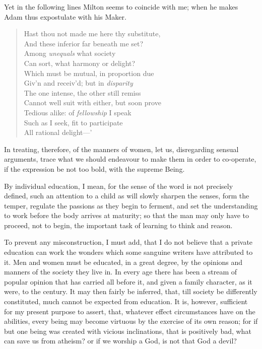 Yet in the following lines Milton seems to coincide with me; when he
makes Adam thus expostulate with his Maker.

\begin{verse}
Hast thou not made me here thy substitute,\\
And these inferior far beneath me set?\\
Among \textit{unequals} what society\\
Can sort, what harmony or delight?\\
Which must be mutual, in proportion due\\
Giv'n and receiv'd; but in \textit{disparity}\\
The one intense, the other still remiss\\
Cannot well suit with either, but soon prove\\
Tedious alike: of \textit{fellowship} I speak\\
Such as I seek, fit to participate\\
All rational delight---'
\end{verse}

In treating, therefore, of the manners of women, let us, disregarding
sensual arguments, trace what we should endeavour to make them in
order to co-operate, if the expression be not too bold, with the
supreme Being.

By individual education, I mean, for the sense of the word is not
precisely defined, such an attention to a child as will slowly sharpen
the senses, form the temper, regulate the passions as they begin to
ferment, and set the understanding to work before the body arrives at
maturity; so that the man may only have to proceed, not to begin, the
important task of learning to think and reason.

To prevent any misconstruction, I must add, that I do not believe that
a private education can work the wonders which some sanguine writers
have attributed to it. Men and women must be educated, in a great
degree, by the opinions and manners of the  society they live
in. In every age there has been a stream of popular opinion that has
carried all before it, and given a family character, as it were, to
the century. It may then fairly be inferred, that, till society be
differently constituted, much cannot be expected from education. It
is, however, sufficient for my present purpose to assert, that,
whatever effect circumstances have on the abilities, every being may
become virtuous by the exercise of its own reason; for if but one
being was created with vicious inclinations, that is positively bad,
what can save us from atheism? or if we worship a God, is not that God
a devil?

